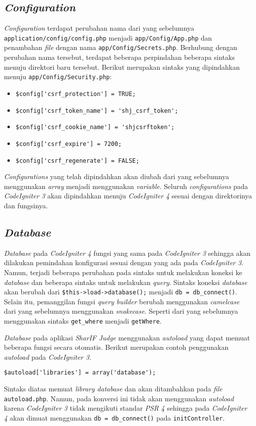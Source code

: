 \subsection{\textit{Configuration}}
\textit{Configuration} terdapat perubahan nama dari yang sebelumnya \texttt{application/config/config.php} menjadi \texttt{app/Config/App.php} dan penambahan \textit{file} dengan nama \texttt{app/Config/Secrets.php}. Berhubung dengan perubahan nama tersebut, terdapat beberapa perpindahan beberapa sintaks menuju direktori baru tersebut. Berikut merupakan sintaks yang dipindahkan menuju \texttt{app/Config/Security.php}:
\begin{itemize}
\item \verb|$config['csrf_protection'] = TRUE;|
\item \verb|$config['csrf_token_name'] = 'shj_csrf_token';|
\item \verb|$config['csrf_cookie_name'] = 'shjcsrftoken';|
\item \verb|$config['csrf_expire'] = 7200;|
\item \verb|$config['csrf_regenerate'] = FALSE;|
\end{itemize}

\textit{Configurations} yang telah dipindahkan akan diubah dari yang sebelumnya menggunakan \textit{array} menjadi menggunakan \textit{variable}. Seluruh \textit{configurations} pada \textit{CodeIgniter 3} akan dipindahkan menuju \textit{CodeIgniter 4} sesuai dengan direktorinya dan fungsinya.

\subsection{\textit{Database}}
\textit{Database} pada \textit{CodeIgniter 4} fungsi yang sama pada \textit{CodeIgniter 3} sehingga akan dilakukan pemindahan konfigurasi sesuai dengan yang ada pada \textit{CodeIgniter 3}. Namun, terjadi beberapa perubahan pada sintaks untuk melakukan koneksi ke \textit{database} dan beberapa sintaks untuk melakukan \textit{query}. Sintaks koneksi \textit{database} akan berubah dari \texttt{\$this->load->database();} menjadi \texttt{db = db\_connect()}. Selain itu, pemanggilan fungsi \textit{query builder} berubah menggunakan \textit{camelcase} dari yang sebelumnya menggunakan \textit{snakecase}. Seperti dari yang sebelumnya menggunakan sintaks \texttt{get\_where} menjadi \texttt{getWhere}.

\textit{Database} pada aplikasi \textit{SharIF Judge} menggunakan \textit{autoload} yang dapat memuat beberapa fungsi secara otomatis. Berikut merupakan contoh penggunakan \textit{autoload} pada \textit{CodeIgniter 3}.
\begin{center}
\verb|$autoload['libraries'] = array('database');|
\end{center}
Sintaks diatas memuat \textit{library database} dan akan  ditambahkan pada \textit{file} \texttt{autoload.php}. Namun, pada konversi ini tidak akan menggunakan \textit{autoload} karena \textit{CodeIgniter 3} tidak mengikuti standar \textit{PSR 4} sehingga pada \textit{CodeIgniter 4} akan dimuat menggunakan \texttt{db = db\_connect()} pada \texttt{initController}.

